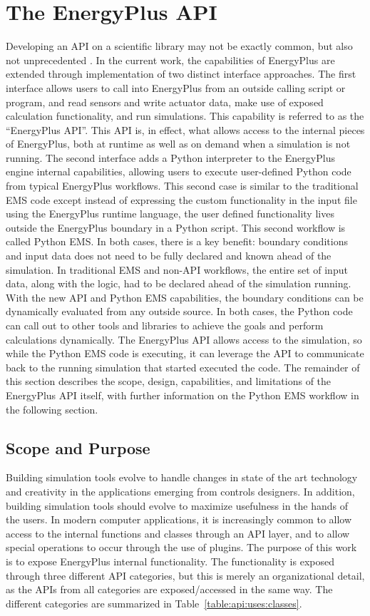 \documentclass[5p, authoryear]{elsarticle}
\begin{document}
\section{The EnergyPlus API} 
Developing an API on a scientific library may not be exactly common, but also not unprecedented \citep{Mohanan2018}.  
In the current work, the capabilities of EnergyPlus are extended through implementation of two distinct interface approaches.
The first interface allows users to call into EnergyPlus from an outside calling script or program, and read sensors and write actuator data, make use of exposed calculation functionality, and run simulations.
This capability is referred to as the ``EnergyPlus API''.
This API is, in effect, what allows access to the internal pieces of EnergyPlus, both at runtime as well as on demand when a simulation is not running.
The second interface adds a Python interpreter to the EnergyPlus engine internal capabilities, allowing users to execute user-defined Python code from typical EnergyPlus workflows.  
This second case is similar to the traditional EMS code except instead of expressing the custom functionality in the input file using the EnergyPlus runtime language, the user defined functionality lives outside the EnergyPlus boundary in a Python script.
This second workflow is called Python EMS.
In both cases, there is a key benefit: boundary conditions and input data does not need to be fully declared and known ahead of the simulation.
In traditional EMS and non-API workflows, the entire set of input data, along with the logic, had to be declared ahead of the simulation running.
With the new API and Python EMS capabilities, the boundary conditions can be dynamically evaluated from any outside source.
In both cases, the Python code can call out to other tools and libraries to achieve the goals and perform calculations dynamically.
The EnergyPlus API allows access to the simulation, so while the Python EMS code is executing, it can leverage the API to communicate back to the running simulation that started executed the code.
The remainder of this section describes the scope, design, capabilities, and limitations of the EnergyPlus API itself, with further information on the Python EMS workflow in the following section.
 
  \subsection{Scope and Purpose}
Building simulation tools evolve to handle changes in state of the art technology and creativity in the applications emerging from controls designers.  In addition, building simulation tools should evolve to maximize usefulness in the hands of the users.  In modern computer applications, it is increasingly common to allow access to the internal functions and classes through an API layer, and to allow special operations to occur through the use of plugins.  The purpose of this work is to expose EnergyPlus internal functionality.  The functionality is exposed through three different API categories, but this is merely an organizational detail, as the APIs from all categories are exposed/accessed in the same way.  The different categories are summarized in Table~\ref{table:api:uses:classes}.
\end{document}
